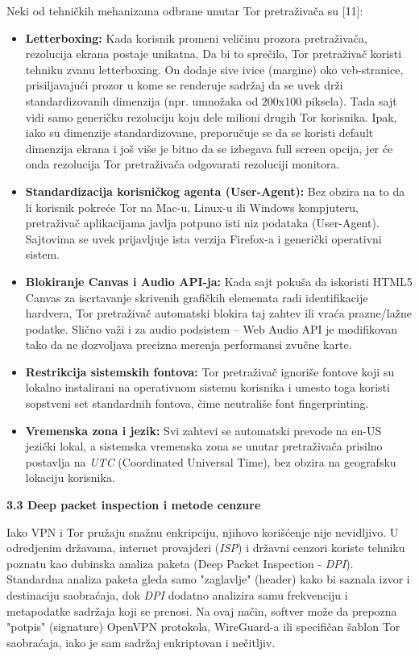 \documentclass[
]{article}
\begin{document}
Neki od tehničkih mehanizama odbrane unutar Tor pretraživača su
{[}11{]}:

\begin{itemize}
\item
  \textbf{Letterboxing:} Kada korisnik promeni veličinu prozora
  pretraživača, rezolucija ekrana postaje unikatna. Da bi to sprečilo,
  Tor pretraživač koristi tehniku zvanu letterboxing. On dodaje sive
  ivice (margine) oko veb-stranice, prisiljavajući prozor u kome se
  renderuje sadržaj da se uvek drži standardizovanih dimenzija (npr.
  umnožaka od 200x100 piksela). Tada sajt vidi samo generičku rezoluciju
  koju dele milioni drugih Tor korisnika. Ipak, iako su dimenzije
  standardizovane, preporučuje se da se koristi default dimenzija ekrana
  i još više je bitno da se izbegava full screen opcija, jer će onda
  rezolucija Tor pretraživača odgovarati rezoluciji monitora.
\item
  \textbf{Standardizacija korisničkog agenta (User-Agent):} Bez obzira
  na to da li korisnik pokreće Tor na Mac-u, Linux-u ili Windows
  kompjuteru, pretraživač aplikacijama javlja potpuno isti niz podataka
  (User-Agent). Sajtovima se uvek prijavljuje ista verzija Firefox-a i
  generički operativni sistem.
\item
  \textbf{Blokiranje Canvas i Audio API-ja:} Kada sajt pokuša da
  iskoristi HTML5 Canvas za iscrtavanje skrivenih grafičkih elemenata
  radi identifikacije hardvera, Tor pretraživač automatski blokira taj
  zahtev ili vraća prazne/lažne podatke. Slično važi i za audio
  podsistem -- Web Audio API je modifikovan tako da ne dozvoljava
  precizna merenja performansi zvučne karte.
\item
  \textbf{Restrikcija sistemskih fontova:} Tor pretraživač ignoriše
  fontove koji su lokalno instalirani na operativnom sistemu korisnika i
  umesto toga koristi sopstveni set standardnih fontova, čime neutrališe
  font fingerprinting.
\item
  \textbf{Vremenska zona i jezik:} Svi zahtevi se automatski prevode na
  en-US jezički lokal, a sistemska vremenska zona se unutar pretraživača
  prisilno postavlja na \emph{UTC} (Coordinated Universal Time), bez
  obzira na geografsku lokaciju korisnika.
\end{itemize}

\protect\hypertarget{_Toc234141046}{}{}\textbf{3.3 Deep packet
inspection i metode cenzure}

Iako VPN i Tor pružaju snažnu enkripciju, njihovo korišćenje nije
nevidljivo. U odredjenim državama, internet provajderi (\emph{ISP}) i
državni cenzori koriste tehniku poznatu kao dubinska analiza paketa
(Deep Packet Inspection - \emph{DPI}). Standardna analiza paketa gleda
samo "zaglavlje" (header) kako bi saznala izvor i destinaciju
saobraćaja, dok \emph{DPI} dodatno analizira samu frekvenciju i
metapodatke sadržaja koji se prenosi. Na ovaj način, softver može da
prepozna "potpis" (signature) OpenVPN protokola, WireGuard-a ili
specifičan šablon Tor saobraćaja, iako je sam sadržaj enkriptovan i
nečitljiv.
\end{document}

